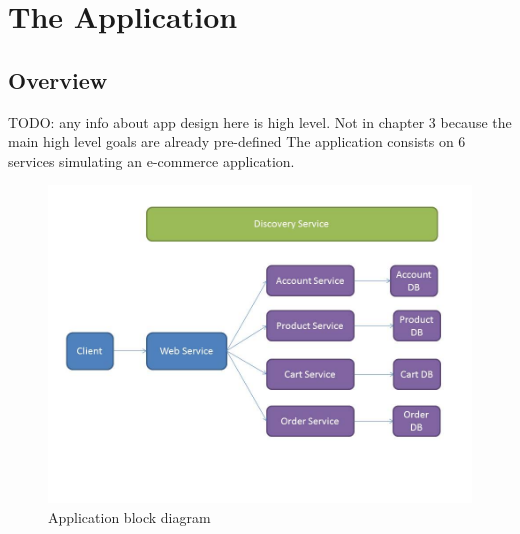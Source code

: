 
\chapter{The Application} %

\label{Chapter2} %




\section{Overview}
TODO: any info about app design here is high level. Not in chapter 3 because the main high level goals are already pre-defined
The application consists on 6 services simulating an e-commerce application.

\begin{figure}
\centering
\includegraphics[width=\textwidth,height=\textheight,keepaspectratio]{Figures/Presentation1}
\decoRule
\caption[Block Diagram]{Application block diagram}
\label{fig:Block Diagram}
\end{figure}

